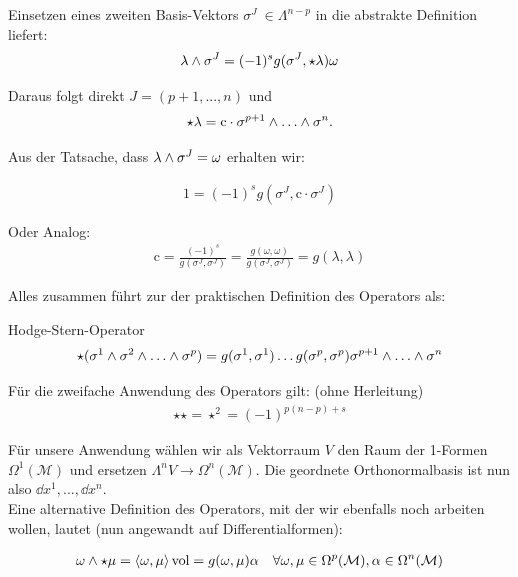  Einsetzen eines zweiten Basis-Vektors $\sigma^J \ \in \Lambda^{n-p}$ in die abstrakte Definition liefert:
\begin{align}
\lambda \wedge \sigma^J = (-1)^s g(\sigma^J,\star \lambda)\omega
\end{align}

Daraus folgt direkt $J = (p+1, ..., n)$ und 
\begin{align}
\star\lambda = \text{c} \cdot \sigma^{p+1} \w \dots \w \sigma^n.
\end{align}

Aus der Tatsache, dass $\lambda \wedge \sigma^J = \omega$ erhalten wir:

\begin{align}
1 = (-1)^s g(\sigma^J,\text{c}\cdot\sigma^J)
\end{align}

Oder Analog:
\begin{align}
\text{c}= \frac{(-1)^s}{g(\sigma^J,\sigma^J)} = \frac{g(\omega,\omega)}{g(\sigma^J,\sigma^J)} = g(\lambda,\lambda)
\end{align}

Alles zusammen führt zur der praktischen Definition des Operators als:
\begin{mybox}{Hodge-Stern-Operator}
\begin{align}
\star(\sigma^1 \w \sigma^2 \w \dots \w \sigma^p) = g(\sigma^1,\sigma^1)\dots g(\sigma^p,\sigma^p) \sigma^{p+1}\w \dots \w \sigma^n
\end{align}
\end{mybox}


 Für die zweifache Anwendung des Operators gilt: (ohne Herleitung)
 \begin{align}
 \star \star = \star^2 = (-1)^{p(n-p)+s}
 \end{align}


Für unsere Anwendung wählen wir als Vektorraum $V$ den Raum der 1-Formen $\Omega^1(\mathcal{M})$ und ersetzen $\Lambda^n V \rightarrow \Omega^n(\mathcal{M})$. Die geordnete Orthonormalbasis ist nun also ${\dd x^1, ..., \dd x^n}$. \\



Eine alternative Definition des Operators, mit der wir ebenfalls noch arbeiten wollen, lautet (nun angewandt auf Differentialformen):

\begin{align}
\omega \wedge \star \mu = \left<\omega,\mu \right>\text{vol} = g(\omega,\mu)\alpha \quad \forall \omega, \mu \in \Omega^p(\mathcal{M}), \alpha \in \Omega^n(\mathcal{M})
\end{align}

